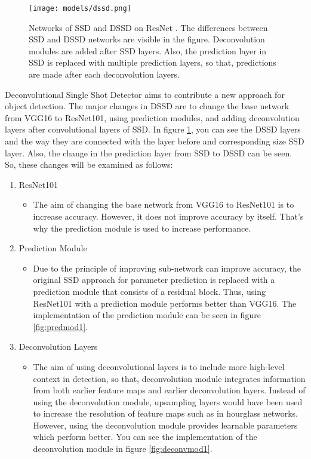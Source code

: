 \documentclass{article}
\begin{document}
\setlength{\parindent}{6ex}

\begin{figure}
    \centering
    \texttt{[image: models/dssd.png]}
    \caption{Networks of SSD and DSSD on ResNet \cite{dssdcite}. 
    The differences between SSD and DSSD networks are visible in the 
    figure. Deconvolution modules are added after SSD layers. Also, 
    the prediction layer in SSD is replaced with multiple prediction layers, 
    so that, predictions are made after each deconvolution layers. }
    \label{fig:dssd1}
\end{figure}

\indent

Deconvolutional Single Shot Detector \cite{dssdcite} aims to contribute a new approach for object 
detection. The major changes in DSSD are to change the base network from VGG16 to 
ResNet101, using prediction modules, and adding deconvolution layers after convolutional 
layers of SSD. In figure \ref{fig:dssd1}, you can see the DSSD layers and the way they are 
connected with the layer before and corresponding size SSD layer. Also, the change in 
the prediction layer from SSD to DSSD can be seen. So, these changes will be examined as follows: 
\begin{enumerate}
    \item ResNet101
    \begin{itemize}
        \item The aim of changing the base network from VGG16 to ResNet101 is to 
increase accuracy. However, it does not improve accuracy by itself. That's why 
the prediction module is used to increase performance.
    \end{itemize}
    \item Prediction Module
    \begin{itemize}
        \item Due to the principle of improving sub-network can improve accuracy, 
the original SSD approach for parameter prediction is replaced with a prediction module that 
consists of a residual block. Thus, using ResNet101 with a prediction module performs 
better than VGG16. The implementation of the prediction module can be seen in figure 
\ref{fig:predmod1}.
    \end{itemize}
    \item Deconvolution Layers
    \begin{itemize}
        \item The aim of using deconvolutional layers is to include more high-level 
context in detection, so that, deconvolution module integrates information from both 
earlier feature maps and earlier deconvolution layers. Instead of using the deconvolution 
module, upsampling layers would have been used to increase the resolution of feature 
maps such as in hourglass networks. However, using the deconvolution module provides 
learnable parameters which perform better. You can see the implementation of 
the deconvolution module in figure \ref{fig:deconvmod1}.
    \end{itemize}
\end{enumerate}
\end{document}
